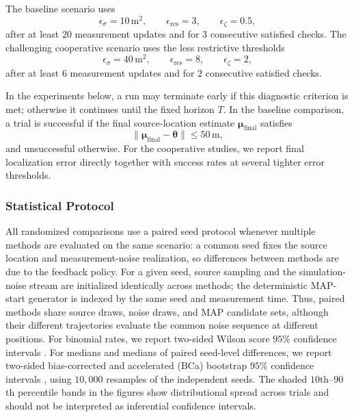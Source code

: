 \documentclass{article}
\newcommand{\bs}[1]{\boldsymbol{#1}}
\begin{document}
The baseline scenario uses
\begin{equation}
\epsilon_\sigma=10\,\mathrm{m}^2,\qquad
\epsilon_{\mathrm{res}}=3,\qquad
\epsilon_\zeta=0.5,
\end{equation}
after at least $20$ measurement updates and for $3$ consecutive satisfied checks.
The challenging cooperative scenario uses the less restrictive thresholds
\begin{equation}
\epsilon_\sigma=40\,\mathrm{m}^2,\qquad
\epsilon_{\mathrm{res}}=8,\qquad
\epsilon_\zeta=2,
\end{equation}
after at least $6$ measurement updates and for $2$ consecutive satisfied checks.

In the experiments below, a run may terminate early if this diagnostic criterion is met; otherwise it continues until the fixed horizon $T$.
In the baseline comparison, a trial is successful if the final source-location estimate $\bs\mu_{\mathrm{final}}$ satisfies
\begin{equation}
\|\bs\mu_{\mathrm{final}}-\bs\theta\|\le 50\,\mathrm{m},
\end{equation}
and unsuccessful otherwise.
For the cooperative studies, we report final localization error directly together with success rates at several tighter error thresholds.

\subsubsection{Statistical Protocol}

All randomized comparisons use a paired seed protocol whenever multiple methods are evaluated on the same scenario: a common seed fixes the source location and measurement-noise realization, so differences between methods are due to the feedback policy.
For a given seed, source sampling and the simulation-noise stream are initialized identically across methods; the deterministic MAP-start generator is indexed by the same seed and measurement time.
Thus, paired methods share source draws, noise draws, and MAP candidate sets, although their different trajectories evaluate the common noise sequence at different positions.
For binomial rates, we report two-sided Wilson score $95\%$ confidence intervals \cite{wilson1927probable}.
For medians and medians of paired seed-level differences, we report two-sided bias-corrected and accelerated (BCa) bootstrap $95\%$ confidence intervals \cite{efron1987better}, using $10{,}000$ resamples of the independent seeds.
The shaded $10$th--$90$th percentile bands in the figures show distributional spread across trials and should not be interpreted as inferential confidence intervals.
\end{document}

